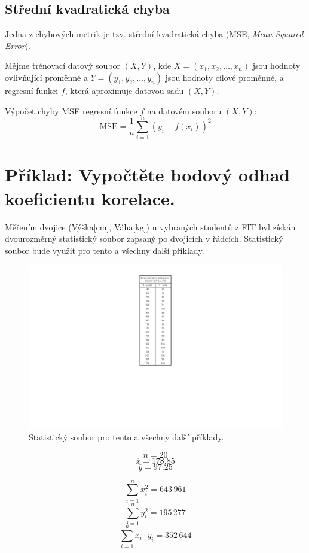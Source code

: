 \subsection{Střední kvadratická chyba}

\begin{compactitem}
    \item Jedna z chybových metrik je tzv. střední kvadratická chyba (MSE, \textit{Mean Squared Error}).

    \item Mějme trénovací datový soubor $(X, Y)$, kde $X = (x_1, x_2, \ldots, x_n)$ jsou hodnoty ovlivňující proměnné a $Y = (y_1, y_2, \ldots, y_n)$ jsou hodnoty cílové proměnné, a regresní funkci $f$, která aproximuje datovou sadu $(X, Y)$.

    \item Výpočet chyby MSE regresní funkce $f$ na datovém souboru $(X, Y)$:
    $$ \text{MSE} = \frac{1}{n} \sum_{i=1}^n (y_i - f(x_i))^2 $$
\end{compactitem}


\section{Příklad: Vypočtěte bodový odhad koeficientu korelace.}

\begin{compactitem}
    \item Měřením dvojice (Výška[cm], Váha[kg]) u vybraných studentů z FIT byl získán dvourozměrný statistický soubor zapsaný po dvojicích v řádcích. Statistický soubor bude využit pro tento a všechny další příklady.
\end{compactitem}

\begin{figure}[H]
    \centering
    \includegraphics[width=.25\linewidth]{2-1-crop.pdf}
    \caption{Statistický soubor pro tento a všechny další příklady.}
\end{figure}

\begin{minipage}{0.49\textwidth}
    $${\displaystyle n = 20}$$
    $${\displaystyle \overline{x} = 178.85}$$
    $${\displaystyle \overline{y} = 97.25}$$
\end{minipage}
%
\begin{minipage}{0.49\textwidth}
    $${\displaystyle \sum_{i=1}^n x_i^2 = 643 \, 961}$$
    $${\displaystyle \sum_{i=1}^n y_i^2 = 195 \, 277}$$
    $${\displaystyle \sum_{i=1}^n x_i \cdot y_i = 352 \, 644}$$
\end{minipage}
\bigskip

